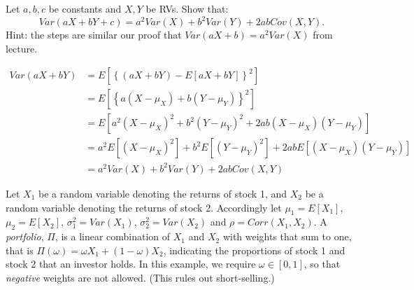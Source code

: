 \documentclass[addpoints,12pt]{exam}\usepackage[]{graphicx}\usepackage[]{color}
\begin{document}
\begin{questions}
\question Let $a, b, c$ be constants and $X,Y$ be RVs.
Show that:
\[Var(aX + bY + c) = a^2 Var(X) + b^2 Var(Y) + 2ab Cov(X,Y).\]
Hint: the steps are similar our proof that $Var(aX + b) = a^2 Var(X)$ from lecture.
\begin{solution}
\begin{align*}
	Var(aX + bY) &= E\left[\left\{\left( aX + bY\right) - E[aX + bY]\right\}^2  \right]\\ 
	&= E\left[  \left\{a (X - \mu_X) + b(Y - \mu_Y)\right\}^2 \right]\\ 
	&= E\left[a^2(X-\mu_X)^2 + b^2(Y-\mu_Y)^2 + 2ab(X-\mu_X)(Y-\mu_Y)  \right]\\
	&= a^2E[(X-\mu_X)^2] + b^2 E[(Y-\mu_Y)^2] + 2ab E[(X-\mu_X)(Y-\mu_Y)]\\
	&= a^2 Var(X) + b^2 Var(Y) + 2ab Cov(X,Y)
\end{align*}
\end{solution}

\question Let $X_1$ be a random variable denoting the returns of stock 1, and $X_2$ be a random variable denoting the returns of stock 2. Accordingly let $\mu_1 = E[X_1]$, $\mu_2 = E[X_2]$, $\sigma_1^2 = Var(X_1)$, $\sigma_2^2 = Var(X_2)$ and $\rho = Corr(X_1, X_2)$. A \emph{portfolio}, $\Pi$,  is a linear combination of $X_1$ and $X_2$ with weights that sum to one, that is $\Pi(\omega) = \omega X_1 + (1-\omega)X_2$, indicating the proportions of stock 1 and stock 2 that an investor holds. In this example, we require $\omega \in [0,1]$, so that \emph{negative} weights are not allowed. (This rules out short-selling.) 
	\begin{parts}

\end{parts}
\end{questions}
\end{document}
